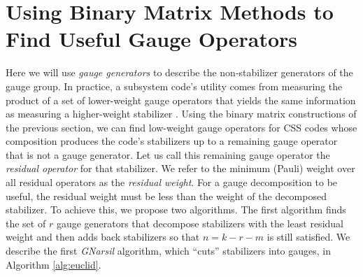 \documentclass[conference]{IEEEtran}
\begin{document}
\section{Using Binary Matrix Methods to Find Useful Gauge Operators}


Here we will use \textit{gauge generators} to describe the non-stabilizer generators of the gauge group.
In practice, a subsystem code's utility comes from measuring the product of a set of lower-weight gauge operators that yields the same information as measuring a higher-weight stabilizer \cite{higgott2021subsystem}. 
Using the binary matrix constructions of the previous section, we can find low-weight gauge operators for CSS codes whose composition produces the code's stabilizers up to a remaining gauge operator that is not a gauge generator.
Let us call this remaining gauge operator the \emph{residual operator} for that stabilizer.
We refer to the minimum (Pauli) weight over all residual operators as the \textit{residual weight}.
For a gauge decomposition to be useful, the residual weight must be less than the weight of the decomposed stabilizer. 
To achieve this, we propose two algorithms. 
The first algorithm finds the set of $r$ gauge generators that decompose stabilizers with the least residual weight and then adds back stabilizers so that $n=k-r-m$ is still satisfied.  
We describe the first \emph{GNarsil} algorithm, which ``cuts'' stabilizers into gauges, in Algorithm \ref{alg:euclid}.


  
\end{document}

